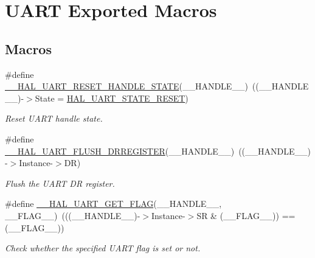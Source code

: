\hypertarget{group___u_a_r_t___exported___macros}{\section{U\-A\-R\-T Exported Macros}
\label{group___u_a_r_t___exported___macros}
}
\subsection*{Macros}
\begin{DoxyCompactItemize}
\item 
\#define \hyperlink{group___u_a_r_t___exported___macros_ga19deab848407b106998416c78092fa9b}{\-\_\-\-\_\-\-H\-A\-L\-\_\-\-U\-A\-R\-T\-\_\-\-R\-E\-S\-E\-T\-\_\-\-H\-A\-N\-D\-L\-E\-\_\-\-S\-T\-A\-T\-E}(\-\_\-\-\_\-\-H\-A\-N\-D\-L\-E\-\_\-\-\_\-)~((\-\_\-\-\_\-\-H\-A\-N\-D\-L\-E\-\_\-\-\_\-)-\/$>$State = \hyperlink{group___u_a_r_t___exported___types_ggaf55d844a35379c204c90be5d1e8e50baa9c7d889fce61ccc717228d099a61d113}{H\-A\-L\-\_\-\-U\-A\-R\-T\-\_\-\-S\-T\-A\-T\-E\-\_\-\-R\-E\-S\-E\-T})
\begin{DoxyCompactList}\small\item\em Reset U\-A\-R\-T handle state. \end{DoxyCompactList}\item 
\#define \hyperlink{group___u_a_r_t___exported___macros_gafc4f20cb0f29ba146c9bc14167c52744}{\-\_\-\-\_\-\-H\-A\-L\-\_\-\-U\-A\-R\-T\-\_\-\-F\-L\-U\-S\-H\-\_\-\-D\-R\-R\-E\-G\-I\-S\-T\-E\-R}(\-\_\-\-\_\-\-H\-A\-N\-D\-L\-E\-\_\-\-\_\-)~((\-\_\-\-\_\-\-H\-A\-N\-D\-L\-E\-\_\-\-\_\-)-\/$>$Instance-\/$>$D\-R)
\begin{DoxyCompactList}\small\item\em Flush the U\-A\-R\-T D\-R register. \end{DoxyCompactList}\item 
\#define \hyperlink{group___u_a_r_t___exported___macros_ga261fe8a2afe84ec048113654266c5bf6}{\-\_\-\-\_\-\-H\-A\-L\-\_\-\-U\-A\-R\-T\-\_\-\-G\-E\-T\-\_\-\-F\-L\-A\-G}(\-\_\-\-\_\-\-H\-A\-N\-D\-L\-E\-\_\-\-\_\-, \-\_\-\-\_\-\-F\-L\-A\-G\-\_\-\-\_\-)~(((\-\_\-\-\_\-\-H\-A\-N\-D\-L\-E\-\_\-\-\_\-)-\/$>$Instance-\/$>$S\-R \& (\-\_\-\-\_\-\-F\-L\-A\-G\-\_\-\-\_\-)) == (\-\_\-\-\_\-\-F\-L\-A\-G\-\_\-\-\_\-))
\begin{DoxyCompactList}\small\item\em Check whether the specified U\-A\-R\-T flag is set or not. \end{DoxyCompactList}\item 

\end{DoxyCompactItemize}
